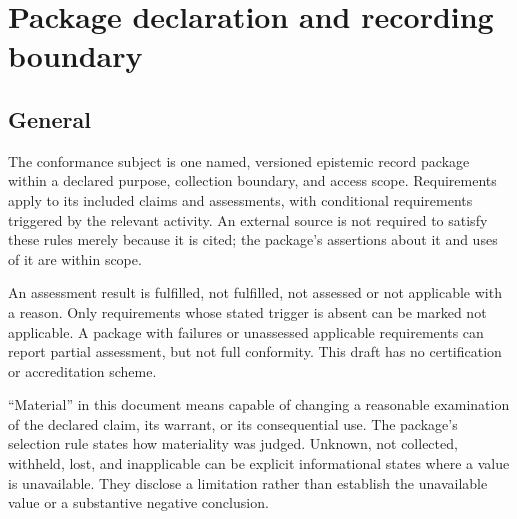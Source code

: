 \documentclass[11pt,a4paper]{article}
\begin{document}
\section{Package declaration and recording boundary}
\subsection{General}

The conformance subject is one named, versioned epistemic record package within a declared purpose, collection boundary, and access scope. Requirements apply to its included claims and assessments, with conditional requirements triggered by the relevant activity. An external source is not required to satisfy these rules merely because it is cited; the package's assertions about it and uses of it are within scope.



An assessment result is fulfilled, not fulfilled, not assessed or not applicable with a reason. Only requirements whose stated trigger is absent can be marked not applicable. A package with failures or unassessed applicable requirements can report partial assessment, but not full conformity. This draft has no certification or accreditation scheme.

``Material'' in this document means capable of changing a reasonable examination of the declared claim, its warrant, or its consequential use. The package's selection rule states how materiality was judged. Unknown, not collected, withheld, lost, and inapplicable can be explicit informational states where a value is unavailable. They disclose a limitation rather than establish the unavailable value or a substantive negative conclusion.
\end{document}
